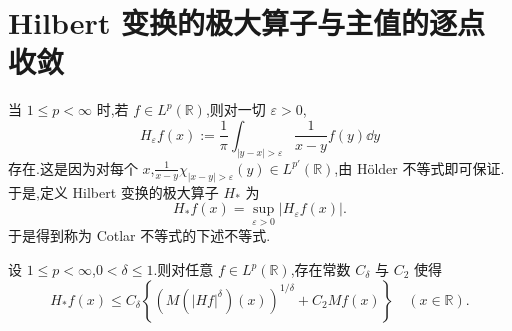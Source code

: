 \section{Hilbert 变换的极大算子与主值的逐点收敛}\label{sec:1.9}


当 $1 \leq p < \infty$ 时,若 $f \in L^{p}(\mathbb{R})$,则对一切 $\varepsilon > 0$,
\begin{equation*}
H_{\varepsilon}f(x) := \frac{1}{\pi}\int_{|y - x| > \varepsilon}\frac{1}{x - y}f(y)\dd y
\end{equation*}
存在.这是因为对每个 $x$,$\frac{1}{x-y}\chi_{|x-y|>\varepsilon}(y) \in L^{p'}(\mathbb{R})$,由 Hölder 不等式即可保证.于是,定义 Hilbert 变换的极大算子 $H_{*}$ 为
\begin{equation*}
H_{*}f(x) = \sup_{\varepsilon > 0}|H_{\varepsilon}f(x)|.
\end{equation*}
于是得到称为 Cotlar 不等式的下述不等式.

\begin{theorem}\label{thm:1.9.1}
设 $1 \leq p < \infty$,$0 < \delta \leq 1$.则对任意 $f \in L^{p}(\mathbb{R})$,存在常数 $C_{\delta}$ 与 $C_{2}$ 使得
\begin{equation*}
H_{*}f(x) \leq C_{\delta}\left\{\left(M\left(|Hf|^{\delta}\right)(x)\right)^{1/\delta} + C_{2}Mf(x)\right\} \quad (x \in \mathbb{R}).
\end{equation*}
\end{theorem}

